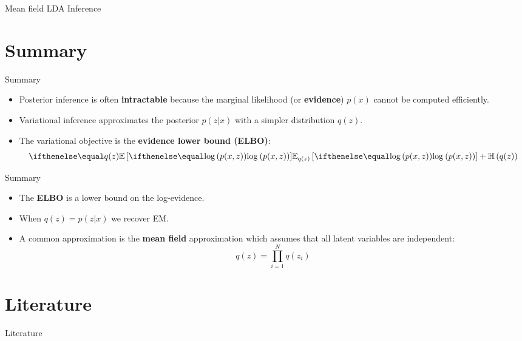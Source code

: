 \documentclass[14pt]{beamer}
\begin{document}
\begin{frame}{Mean field LDA Inference}
\begin{figure}
\end{figure}
\end{frame}

\section{Summary}

\begin{frame}{Summary}
\begin{itemize}
\item Posterior inference is often \textbf{intractable} because the marginal likelihood (or \textbf{evidence}) 
$ p(x) $ cannot be computed efficiently.
\item Variational inference approximates the posterior $ p(z|x) $ with a simpler distribution $ q(z) $.
\item The variational objective is the \textbf{evidence lower bound (ELBO)}:
\begin{equation}
\E[q(z)]{\loga{p(x,z)}} + \Ent{q(z)}
\end{equation}
\end{itemize}
\end{frame}

\begin{frame}{Summary}
\begin{itemize}
\item The \textbf{ELBO} is a lower bound on the log-evidence.
\item When $ q(z) = p(z|x) $ we recover EM.
\item A common approximation is the \textbf{mean field} approximation which assumes that all latent variables
are independent:
\begin{equation*}
q(z) = \prod_{i=1}^{N} q(z_{i})
\end{equation*}
\end{itemize}
\end{frame}

\section{Literature}

\nocite{BleiEtAl:2016}
\nocite{NealHinton:1998}
\nocite{GhahramaniJordan:1996}
\nocite{BleiEtAl:2003}

\begin{frame}[allowframebreaks]{Literature}

\small

\end{frame}
\end{document}

